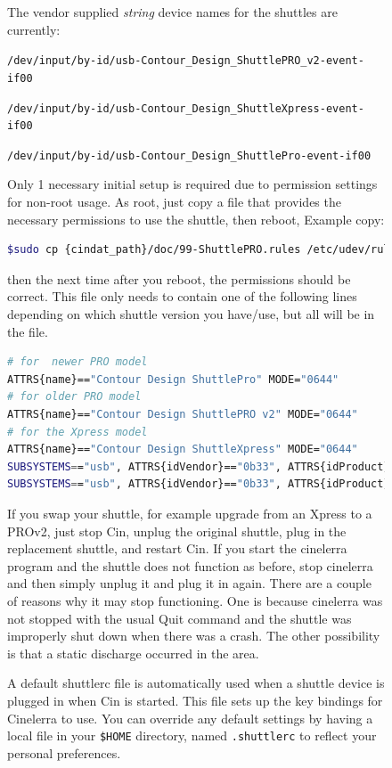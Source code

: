 \begin{figure}
\noindent The vendor supplied \textit{string} device names for the shuttles are currently:

{\small
\vspace{1ex} \texttt{/dev/input/by-id/usb-Contour\_Design\_ShuttlePRO\_v2-event-if00}
 
 \texttt{/dev/input/by-id/usb-Contour\_Design\_ShuttleXpress-event-if00}
 
 \texttt{/dev/input/by-id/usb-Contour\_Design\_ShuttlePro-event-if00}
 }

\vspace{1ex}
\noindent Only 1 necessary initial setup is required due to permission settings for non-root usage. As root, just copy a file that provides the necessary permissions to use the shuttle, then reboot,  Example copy:

\begin{lstlisting}[language=Bash]
$sudo cp {cindat_path}/doc/99-ShuttlePRO.rules /etc/udev/rules.d/
\end{lstlisting}

\noindent then the next time after you reboot, the permissions should be correct. This file only needs to contain one of the following lines depending on which shuttle version you have/use, but all will be in the file.
\begin{lstlisting}[language=Bash,basicstyle=\footnotesize]
# for  newer PRO model 
ATTRS{name}=="Contour Design ShuttlePro" MODE="0644"		
# for older PRO model 
ATTRS{name}=="Contour Design ShuttlePRO v2" MODE="0644"	
# for the Xpress model 
ATTRS{name}=="Contour Design ShuttleXpress" MODE="0644"	
SUBSYSTEMS=="usb", ATTRS{idVendor}=="0b33", ATTRS{idProduct}=="0020", MODE="0666" 
SUBSYSTEMS=="usb", ATTRS{idVendor}=="0b33", ATTRS{idProduct}=="0030", MODE="0666"
\end{lstlisting}
If you swap your shuttle, for example upgrade from an Xpress to a PROv2, just stop Cin, unplug the original shuttle, plug in the replacement shuttle, and restart Cin.  If you start the cinelerra program and the shuttle does not function as before, stop cinelerra and then simply unplug it and plug it in again.  There are a couple of reasons why it may stop functioning.  One is because cinelerra was not stopped with the usual Quit command and the shuttle was improperly shut down when there was a crash.  The other possibility is that a static discharge occurred in the area.

A default shuttlerc file is automatically used when a shuttle device is plugged in when Cin is started. This file sets up the key bindings for Cinelerra to use. You can override any default settings by having a local file in your \texttt{\$HOME} directory, named \texttt{.shuttlerc} to reflect your personal preferences.


\end{figure}
